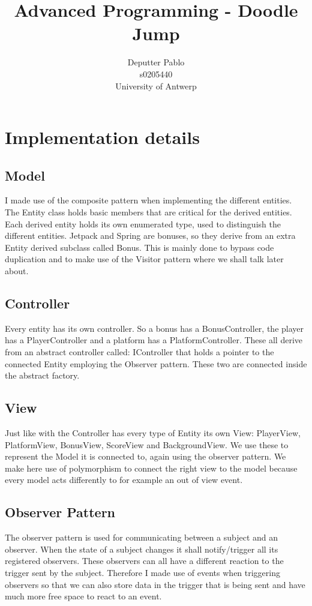 \documentclass{report}
\title{Advanced Programming - Doodle Jump}
\author{Deputter Pablo \\ s0205440 \\ University of Antwerp}
\begin{document}
\maketitle

\chapter*{Implementation details}

\section{Model}
I made use of the composite pattern when implementing the different entities. The Entity class holds basic members that are critical for the derived entities. Each derived entity holds its own enumerated type, used to distinguish the different entities. Jetpack and Spring are bonuses, so they derive from an extra Entity derived subclass called Bonus. This is mainly done to bypass code duplication and to make use of the Visitor pattern where we shall talk later about.

\section{Controller}
Every entity has its own controller. So a bonus has a BonusController, the player has a PlayerController and a platform has a PlatformController. These all derive from an abstract controller called: IController that holds a pointer to the connected Entity employing the Observer pattern. These two are connected inside the abstract factory.

\section{View}
Just like with the Controller has every type of Entity its own View: PlayerView, PlatformView, BonusView, ScoreView and BackgroundView. We use these to represent the Model it is connected to, again using the observer pattern. We make here use of polymorphism to connect the right view to the model because every model acts differently to for example an out of view event.

\section{Observer Pattern}
The observer pattern is used for communicating between a subject and an observer. When the state of a subject changes it shall notify/trigger all its registered observers. These observers can all have a different reaction to the trigger sent by the subject. Therefore I made use of events when triggering observers so that we can also store data in the trigger that is being sent and have much more free space to react to an event.
\end{document}
